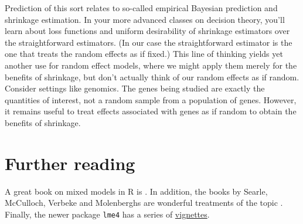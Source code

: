 Prediction of this sort relates to so-called empirical Bayesian prediction 
and shrinkage estimation. In your more advanced classes on decision theory,
you'll learn about loss functions and uniform desirability of shrinkage
estimators over the straightforward estimators. (In our case the straightforward
estimator is the one that treats the random
effects as if fixed.) This line of thinking yields yet another use for random effect models, where
we might apply them merely for the benefits of shrinkage,
but don't actually think of our random effects as if random. Consider
settings like genomics. The genes being studied are exactly the quantities
of interest, not a random sample from a population of genes. However, it
remains useful to treat effects associated with genes as if random to 
obtain the benefits of shrinkage.


\section{Further reading}
A great book on mixed models in R is \cite{pinheiro2006mixed}. 
In addition, the books by Searle, McCulloch,
Verbeke and Molenberghs are  wonderful treatments of the topic
\citep{mcculloch2001linear,verbeke2009linear}. Finally, the
newer package \texttt{lme4} has a series of 
\href{https://cran.r-project.org/web/packages/lme4/index.html}{vignettes}.

